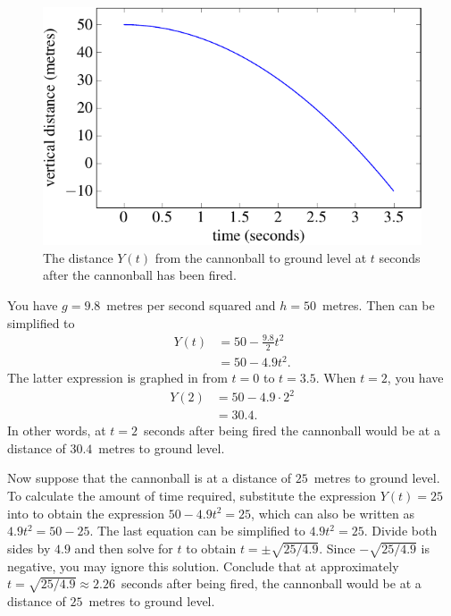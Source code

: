 \documentclass[a4paper,oneside,12pt]{article}
\begin{document}
\begin{problem}
{\begin{solution}
\begin{figure}[!htbp]
\centering
\includegraphics[scale=1]{image/13/cannonball-vertical-displacement.pdf}
\caption{%
  The distance $Y(t)$ from the cannonball to ground level at $t$
  seconds after the cannonball has been fired.
}
\label{fig:trigonometric:cannon_cliff_vertical_displacement}
\end{figure}

You have $g = 9.8$~metres per second squared and $h = 50$~metres.
Then 
can be simplified to
\begin{equation}
\label{eqn:trigonometric:cannon_vertical_distance_h_50}
\begin{aligned}
Y(t)
&=
50 - \frac{9.8}{2} t^2 \\[4pt]
&=
50 - 4.9 t^2.
\end{aligned}
\end{equation}
The latter expression is graphed in
 from
$t = 0$ to $t = 3.5$.  When $t = 2$, you have
\begin{align*}
Y(2)
&=
50 - 4.9 \cdot 2^2 \\[4pt]
&=
30.4.
\end{align*}
In other words, at $t = 2$~seconds after being fired the cannonball
would be at a distance of $30.4$~metres to ground level.

Now suppose that the cannonball is at a distance of $25$~metres to
ground level.  To calculate the amount of time required, substitute
the expression $Y(t) = 25$ into
 to obtain
the expression $50 - 4.9t^2 = 25$, which can also be written as
$4.9t^2 = 50 - 25$.  The last equation can be simplified to
$4.9t^2 = 25$.  Divide both sides by $4.9$ and then solve for $t$ to
obtain $t = \pm\sqrt{25 / 4.9}$.  Since $-\sqrt{25 / 4.9}$ is
negative, you may ignore this solution.  Conclude that at
approximately $t = \sqrt{25 / 4.9} \approx 2.26$~seconds after being
fired, the cannonball would be at a distance of $25$~metres to ground
level.


\end{solution}}
\end{problem}
\end{document}
